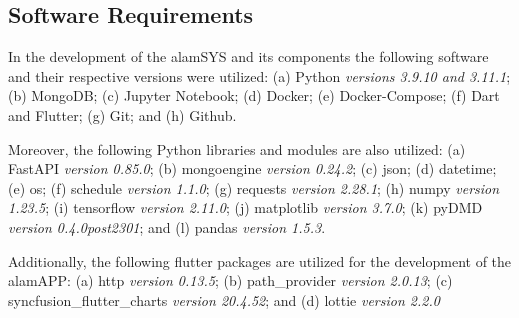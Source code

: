 \subsection{Software Requirements}
\label{sec:software_requirements}

In the development of the alamSYS and its components the following software and their
respective versions were utilized: (a) Python \textit{versions 3.9.10 and 3.11.1};
(b) MongoDB; (c) Jupyter Notebook; (d) Docker; (e) Docker-Compose; (f) Dart and Flutter;
(g) Git; and (h) Github.

Moreover, the following Python libraries and modules are also utilized:
(a) FastAPI \textit{version 0.85.0};
(b) mongoengine \textit{version 0.24.2};
(c) json; (d) datetime; (e) os;
(f) schedule \textit{version 1.1.0};
(g) requests \textit{version 2.28.1};
(h) numpy \textit{version 1.23.5};
(i) tensorflow \textit{version 2.11.0};
(j) matplotlib \textit{version 3.7.0};
(k) pyDMD \textit{version 0.4.0post2301}; and 
(l) pandas \textit{version 1.5.3}.

Additionally, the following flutter packages are utilized for the development of the alamAPP:
(a) http \textit{version 0.13.5};
(b) path\_provider \textit{version 2.0.13};
(c) syncfusion\_flutter\_charts \textit{version 20.4.52}; and 
(d) lottie \textit{version 2.2.0}